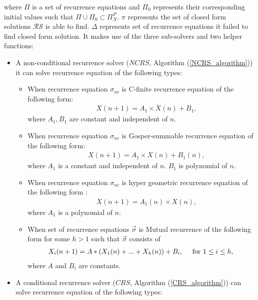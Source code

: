 \documentclass{article}
\begin{document}
where $\Pi$ is a set of recurrence equations and $\Pi_{0}$ represents their  corresponding initial values such that  $\Pi\cup\Pi_{0} \subset \Pi_{X}^{P}$. $\pi$ represents the set of closed form solutions $\mathcal{RS}$ is able to find. $\Delta$ represents set of recurrence equations it failed to find closed form solution.  It
makes use of the three sub-solvers and two helper functions:
\begin{itemize}
	\item A non-conditional recurrence solver ($NCRS$, Algorithm (\ref{NCRS_algorithm})) it can solve recurrence equation of the following types:
	\begin{itemize}
	\item When recurrence equation $\sigma_{nc}$ is C-finite recurrence equation of the following form:
	\begin{eqnarray*}
      &&X(n+1) = A_1 \times X(n)+B_1,\label{rec1}
    \end{eqnarray*}
     where $A_1,B_1$ are constant and independent of $n$.
	\item When recurrence equation $\sigma_{nc}$ is Gosper-summable recurrence equation of the following form:
	\begin{eqnarray*}
      &&X(n+1) = A_1 \times X(n)+B_1(n),\label{rec2}
    \end{eqnarray*}
    where $A_1$ is a  constant and independent of $n$. $B_1$ is polynomial of $n$.
    \item When recurrence equation $\sigma_{nc}$ is hyper geometric recurrence equation of the following form :
    \begin{eqnarray*}
      &&X(n+1) = A_1(n) \times X(n),\label{rec3}
    \end{eqnarray*}
     where $A_1$ is a polynomial of $n$.
    \item When set of recurrence equations $\vec{\sigma}$ is Mutual recurrence of the following form for some $h>1$ such that  $\vec{\sigma}$ consists of
     \begin{eqnarray}
     X_i(n+1) = A*(X_1(n)+...+X_h(n)) + B_i, \hspace*{1em}\mbox{ for }1\leq i\leq h,\label{rec4}
     \end{eqnarray}
     where $A$ and $B_i$ are constants.
	\end{itemize}
	\item A conditional recurrence solver ($CRS$, Algorithm (\ref{CRS_algorithm})) can solve recurrence equation of the following types:
	\begin{itemize}

\end{itemize}
\end{itemize}
\end{document}
